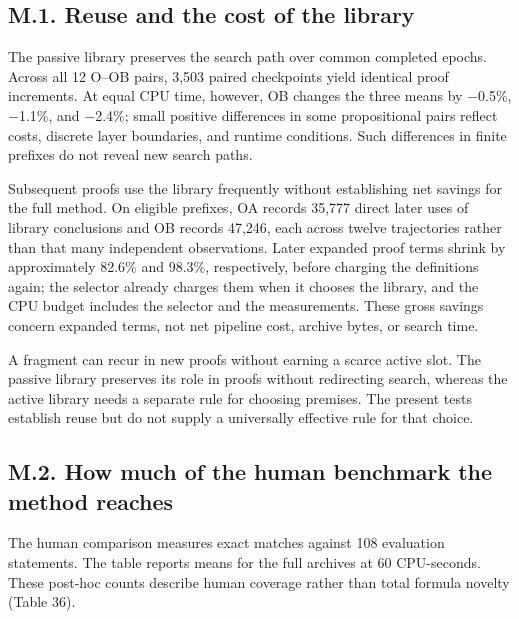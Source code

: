 \documentclass[pdflatex,sn-basic,Numbered]{sn-jnl}
\begin{document}
\subsection*{M.1. Reuse and the cost of the library}\label{m.1.-reuse-and-the-cost-of-the-library}

The passive library preserves the search path over common completed epochs. Across all 12 O--OB pairs, 3,503 paired checkpoints yield identical proof increments. At equal CPU time, however, OB changes the three means by \ensuremath{-}0.5\%, \ensuremath{-}1.1\%, and \ensuremath{-}2.4\%; small positive differences in some propositional pairs reflect costs, discrete layer boundaries, and runtime conditions. Such differences in finite prefixes do not reveal new search paths.

Subsequent proofs use the library frequently without establishing net savings for the full method. On eligible prefixes, OA records 35,777 direct later uses of library conclusions and OB records 47,246, each across twelve trajectories rather than that many independent observations. Later expanded proof terms shrink by approximately 82.6\% and 98.3\%, respectively, before charging the definitions again; the selector already charges them when it chooses the library, and the CPU budget includes the selector and the measurements. These gross savings concern expanded terms, not net pipeline cost, archive bytes, or search time.

A fragment can recur in new proofs without earning a scarce active slot. The passive library preserves its role in proofs without redirecting search, whereas the active library needs a separate rule for choosing premises. The present tests establish reuse but do not supply a universally effective rule for that choice.

\subsection*{M.2. How much of the human benchmark the method reaches}\label{m.2.-how-much-of-the-human-benchmark-the-method-reaches}

The human comparison measures exact matches against 108 evaluation statements. The table reports means for the full archives at 60 CPU-seconds. These post-hoc counts describe human coverage rather than total formula novelty (Table 36).
\end{document}
